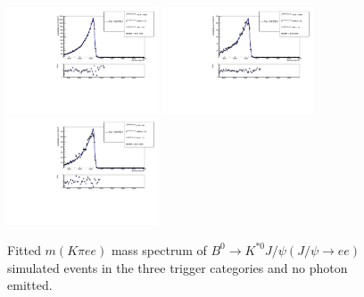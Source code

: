 \begin{figure}[h!]
\centering
\includegraphics[width=0.40\textwidth]{RKst/figs/fit_EEs_0_EE-q2central-gmc/KstJPsEE_0g_L0E_fitAndRes.pdf}
\includegraphics[width=0.40\textwidth]{RKst/figs/fit_EEs_0_EE-q2central-gmc/KstJPsEE_0g_L0H_fitAndRes.pdf}
\includegraphics[width=0.40\textwidth]{RKst/figs/fit_EEs_0_EE-q2central-gmc/KstJPsEE_0g_L0I_fitAndRes.pdf}
\caption{Fitted $m(K\pi ee)$ mass spectrum of $B^0 \rightarrow K^{*0} J/\psi(J/\psi\rightarrow ee)$ simulated
events in the three trigger categories and no photon emitted. }
\label{fig:FitEE_MC_inTrigCat_Brem0}
\end{figure}
%
